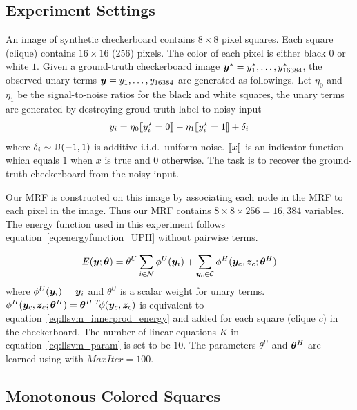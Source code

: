 \subsection{Experiment Settings}
\label{sec:experiment-settings}

An image of synthetic checkerboard contains $8 \times 8$ pixel
squares. Each square (clique) contains $16 \times 16$ (256)
pixels. The color of each pixel is either black $0$ or white $1$.
Given a ground-truth checkerboard image
${\bm{y}}^*=y^*_1,\dots,y^*_{16384}$, the observed unary terms
${\bm{y}}=y_1,\dots,y_{16384}$ are generated as followings. Let
$\eta_0$ and $\eta_1$ be the signal-to-noise ratios for the black
and white squares, the unary terms are generated by destroying
groud-truth label to noisy input
\begin{align}
  \label{eq:noisy_checkerboard}
  y_i = \eta_0 \ind{y^\star_i = 0} - \eta_1 \ind{y^\star_i = 1} + \delta_i
\end{align}
where $\delta_i
\sim {\mathbb{U}}(-1, 1)$ is additive i.i.d.\ uniform noise. $\ind{x}$ is
an indicator function which equals $1$ when $x$ is true and $0$
otherwise. The task is to recover the ground-truth checkerboard
from the noisy input.

Our MRF is constructed on this image by associating each node in
the MRF to each pixel in the image. Thus our MRF contains $8
\times 8 \times 256 = 16,384$ variables. The energy function used
in this experiment follows equation~\eqref{eq:energyfunction_UPH}
without pairwise terms.

\begin{align}
  \label{eq:syncheck_energy}
  E({\bm{y}};{\bm{\theta}})=\theta^U\sum_{i\in {\mathcal{N}}}{\phi^U({\bm{y}}_i)}+
  \sum_{{\bm{y}}_c\in {\mathcal{C}}}{\phi^H({\bm{y}}_c,{\bm{z}}_c;{\bm{\theta}}^H)}
\end{align}
where $\phi^U({\bm{y}}_i)={\bm{y}}_i$ and $\theta^U$ is a scalar weight for
unary terms. $\phi^H({\bm{y}}_c,{\bm{z}}_c;{\bm{\theta}}^H)={\bm{\theta}}^{H\;T} \!
\phi({\bm{y}}_c,{\bm{z}}_c)$ is equivalent to
equation~\eqref{eq:llsvm_innerprod_energy} and added for each
square (clique $c$) in the checkerboard. The number of linear
equations $K$ in equation~\eqref{eq:llsvm_param} is set to be
$10$. The parameters $\theta^U$ and ${\bm{\theta}}^H$ are learned using
 with $MaxIter=100$. 

\subsection{Monotonous Colored Squares}
\label{sec:monot-color-squar}

